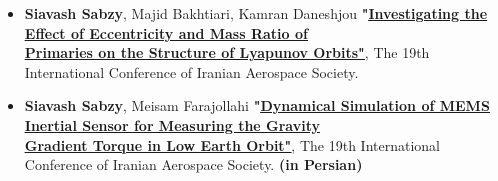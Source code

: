 \documentclass[10pt,a4paper,times]{moderncv}
\begin{document}
\begin{itemize}
 \item \textbf{Siavash Sabzy}, Majid Bakhtiari, Kamran Daneshjou
 \textbf{"\href{https://civilica.com/doc/1362193}{\underline{Investigating the Effect of Eccentricity and Mass Ratio of}} \\ \href{https://civilica.com/doc/1362193}{\underline{Primaries on the Structure of Lyapunov Orbits"}}}, The 19th International Conference of Iranian Aerospace Society. 
 
 \item \textbf{Siavash Sabzy}, Meisam Farajollahi
 \textbf{"\href{https://civilica.com/doc/1362348/}{\underline{Dynamical Simulation of MEMS Inertial Sensor for Measuring the Gravity}}\\\href{https://civilica.com/doc/1362348/}{\underline{Gradient Torque in Low Earth Orbit"}}}, The 19th International Conference of Iranian Aerospace Society. \textbf{(in Persian)} 
\end{itemize}






\end{document}
